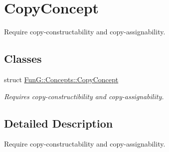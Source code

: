 \hypertarget{group__CopyConcept}{\section{Copy\-Concept}
\label{group__CopyConcept}
}


Require copy-\/constructability and copy-\/assignability.  


\subsection*{Classes}
\begin{DoxyCompactItemize}
\item 
struct \hyperlink{structFunG_1_1Concepts_1_1CopyConcept}{Fun\-G\-::\-Concepts\-::\-Copy\-Concept}
\begin{DoxyCompactList}\small\item\em Requires copy-\/constructibility and copy-\/assignability. \end{DoxyCompactList}\end{DoxyCompactItemize}


\subsection{Detailed Description}
Require copy-\/constructability and copy-\/assignability. 